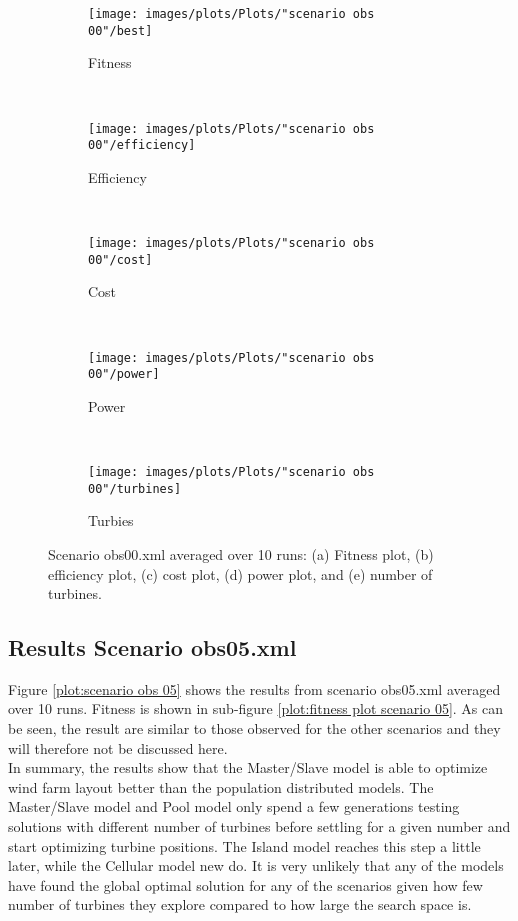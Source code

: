 \begin{figure}[h!]
    \centering
      \begin{subfigure}[b]{0.45\textwidth}
        \texttt{[image: images/plots/Plots/"scenario obs 00"/best]}
        \caption{Fitness}
        \hfill
        \label{plot:fitness plot scenario obs 00}
    \end{subfigure}
    ~
      \begin{subfigure}[b]{0.45\textwidth}
        \texttt{[image: images/plots/Plots/"scenario obs 00"/efficiency]}
        \caption{Efficiency}
        \hfill
        \label{plot:efficiency plot scenario obs 00}
    \end{subfigure}
    ~
    \begin{subfigure}[b]{0.45\textwidth}
        \texttt{[image: images/plots/Plots/"scenario obs 00"/cost]}
        \caption{Cost}
        \hfill
        \label{plot:cost plot scenario obs 00}
    \end{subfigure}
    ~
    \begin{subfigure}[b]{0.45\textwidth}
        \texttt{[image: images/plots/Plots/"scenario obs 00"/power]}
        \caption{Power}
        \hfill
        \label{plot:power plot scenario obs 00}
    \end{subfigure}
    ~
    \begin{subfigure}[b]{0.45\textwidth}
        \texttt{[image: images/plots/Plots/"scenario obs 00"/turbines]}
        \caption{Turbies}
        \hfill
        \label{plot:turbines plot scenario obs 00}
    \end{subfigure}
    \caption{Scenario obs00.xml averaged over 10 runs: (a) Fitness plot, (b) efficiency plot, (c) cost plot, (d) power plot, and (e) number of turbines.}
    \label{plot:scenario obs 00}
\end{figure}


\subsection{Results Scenario obs05.xml}
\noindent Figure \ref{plot:scenario obs 05} shows the results from scenario obs05.xml averaged over 10 runs. Fitness is shown in sub-figure \ref{plot:fitness plot scenario 05}. As can be seen, the result are similar to those observed for the other scenarios and they will therefore not be discussed here.\\ 

\noindent In summary, the results show that the Master/Slave model is able to optimize wind farm layout better than the population distributed models. The Master/Slave model and Pool model only spend a few generations testing solutions with different number of turbines before settling for a given number and start optimizing turbine positions. The Island model reaches this step a little later, while the Cellular model new do. It is very unlikely that any of the models have found the global optimal solution for any of the scenarios given how few number of turbines they explore compared to how large the search space is.\\


